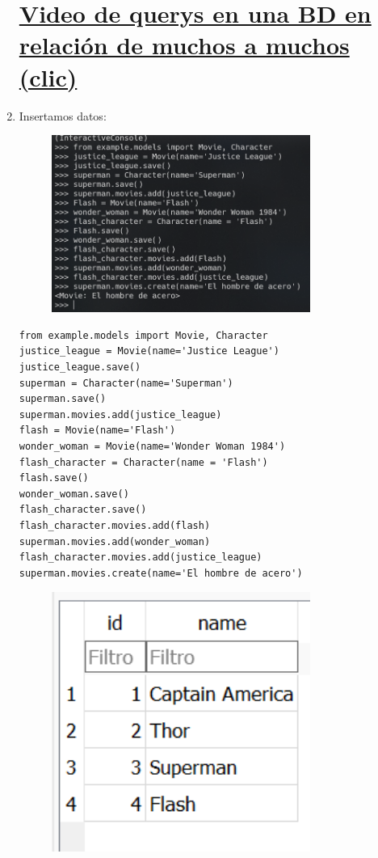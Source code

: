 \documentclass{article}
\begin{document}
\begin{enumerate}
\section{\normalfont\small\href{https://drive.google.com/file/d/16Z8nzSkUnn7K6iTZ4VvAveV37piMwCM2/view}{Video de querys en una BD en relación de muchos a muchos (clic)}} 

  \item Insertamos datos:

\begin{figure}[H]
		\centering
		\includegraphics[width=0.8\textwidth,keepaspectratio]{img/Ejercicio2/1.png}
	\end{figure}
\begin{lstlisting}
from example.models import Movie, Character
justice_league = Movie(name='Justice League')
justice_league.save()
superman = Character(name='Superman')
superman.save()
superman.movies.add(justice_league)
flash = Movie(name='Flash')
wonder_woman = Movie(name='Wonder Woman 1984')
flash_character = Character(name = 'Flash')
flash.save()
wonder_woman.save()
flash_character.save()
flash_character.movies.add(flash)
superman.movies.add(wonder_woman)
flash_character.movies.add(justice_league)
superman.movies.create(name='El hombre de acero')
\end{lstlisting}
\begin{figure}[H]
		\centering
\includegraphics[width=0.8\textwidth,keepaspectratio]{img/Ejercicio2/2.png}

\end{figure}
\end{enumerate}
\end{document}
